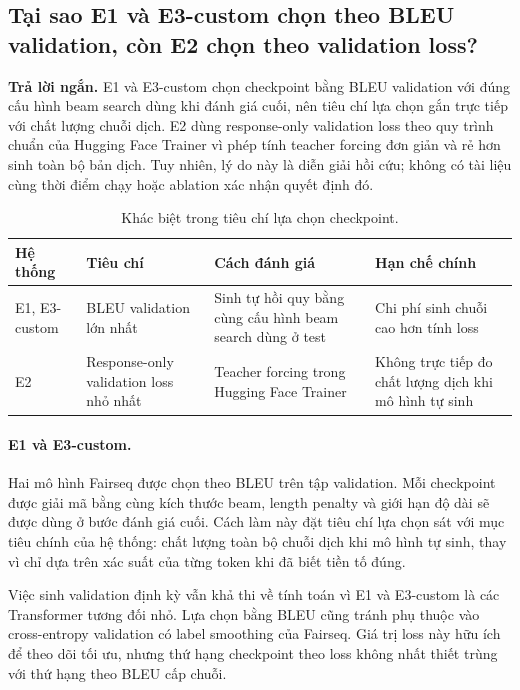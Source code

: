 \documentclass[11pt]{article}
\newcommand{\quickanswer}[1]{%
  \par\medskip
  \noindent\colorbox{qasoft}{%
    \parbox{\dimexpr\linewidth-2\fboxsep\relax}{%
      \textcolor{qaaccent}{\textbf{Trả lời ngắn.}} #1}}
  \par\medskip
}
\begin{document}
\subsection{Tại sao E1 và E3-custom chọn theo BLEU validation, còn E2 chọn
theo validation loss?}

\quickanswer{E1 và E3-custom chọn checkpoint bằng BLEU validation với đúng cấu
hình beam search dùng khi đánh giá cuối, nên tiêu chí lựa chọn gắn trực tiếp
với chất lượng chuỗi dịch. E2 dùng response-only validation loss theo quy trình
chuẩn của Hugging Face Trainer vì phép tính teacher forcing đơn giản và rẻ hơn
sinh toàn bộ bản dịch. Tuy nhiên, lý do này là diễn giải hồi cứu; không có tài
liệu cùng thời điểm chạy hoặc ablation xác nhận quyết định đó.}

\begin{table}[H]
  \centering
  \small
  \caption{Khác biệt trong tiêu chí lựa chọn checkpoint.}
  \label{tab:qa-checkpoint-selection}
  \begin{tabularx}{\linewidth}{
    @{}
    >{\raggedright\arraybackslash}p{2.4cm}
    >{\raggedright\arraybackslash}p{3.2cm}
    >{\raggedright\arraybackslash}p{3.2cm}
    >{\raggedright\arraybackslash}X
    @{}}
    \toprule
    Hệ thống & Tiêu chí & Cách đánh giá & Hạn chế chính \\
    \midrule
    E1, E3-custom
      & BLEU validation lớn nhất
      & Sinh tự hồi quy bằng cùng cấu hình beam search dùng ở test
      & Chi phí sinh chuỗi cao hơn tính loss \\
    E2
      & Response-only validation loss nhỏ nhất
      & Teacher forcing trong Hugging Face Trainer
      & Không trực tiếp đo chất lượng dịch khi mô hình tự sinh \\
    \bottomrule
  \end{tabularx}
\end{table}

\paragraph{E1 và E3-custom.}
Hai mô hình Fairseq được chọn theo BLEU trên tập validation. Mỗi checkpoint
được giải mã bằng cùng kích thước beam, length penalty và giới hạn độ dài sẽ
được dùng ở bước đánh giá cuối. Cách làm này đặt tiêu chí lựa chọn sát với mục
tiêu chính của hệ thống: chất lượng toàn bộ chuỗi dịch khi mô hình tự sinh,
thay vì chỉ dựa trên xác suất của từng token khi đã biết tiền tố đúng.

Việc sinh validation định kỳ vẫn khả thi về tính toán vì E1 và E3-custom là
các Transformer tương đối nhỏ. Lựa chọn bằng BLEU cũng tránh phụ thuộc vào
cross-entropy validation có label smoothing của Fairseq. Giá trị loss này hữu
ích để theo dõi tối ưu, nhưng thứ hạng checkpoint theo loss không nhất thiết
trùng với thứ hạng theo BLEU cấp chuỗi.
\end{document}

